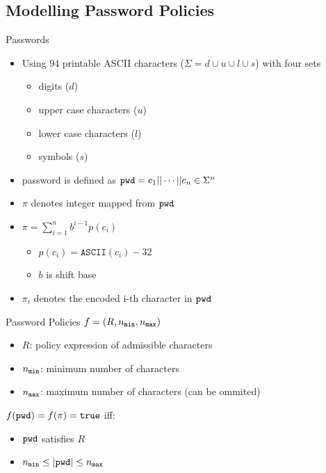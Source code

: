 \documentclass[notes,xcolor=dvipsnames]{beamer}
\begin{document}
\subsection{Modelling Password Policies}

\begin{frame}{Passwords}
  
\begin{itemize}
  \item Using 94 printable ASCII characters ($\Sigma=d\cup u \cup l \cup s$) with four sets
  \begin{itemize}
    \item digits ($d$)
    \item upper case characters ($u$)
    \item lower case characters ($l$)
    \item symbols ($s$)
  \end{itemize}
  \item password is defined as $\mathtt{pwd}=c_1 || \cdots || c_n\in\Sigma^n$
\end{itemize}

\begin{itemize}
  \item $\pi$ denotes integer mapped from $\mathtt{pwd}$
  \item $\pi=\sum_{i=1}^n b^{i-1}p(c_i)$
  \begin{itemize}
    \item $p(c_i)=\texttt{ASCII}(c_i)-32$
    \item $b$ is shift base
  \end{itemize}
  \item $\pi_i$ denotes the encoded i-th character in $\mathtt{pwd}$
\end{itemize}

\end{frame}

\begin{frame}{Password Policies}
   $f=(R, {n_\mathtt{min}}, {n_\mathtt{max}})$
  \begin{itemize}
    \item $R$: policy expression of admissible characters
    \item ${n_\mathtt{min}}$: minimum number of characters
    \item ${n_\mathtt{max}}$: maximum number of characters (can be ommited)
  \end{itemize}
  
  \vspace*{2em}
  $f(\mathtt{pwd})=f(\pi)=\mathtt{true}$ iff:
  \begin{itemize}
    \item $\mathtt{pwd}$ satisfies $R$
    \item ${n_\mathtt{min}}\leq |\mathtt{pwd}| \leq {n_\mathtt{max}}$
  \end{itemize}
\end{frame}
\end{document}
